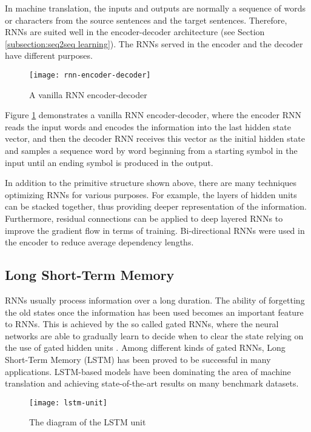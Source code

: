 In machine translation, the inputs and outputs are normally a sequence of words or characters from the source sentences and the target sentences. Therefore, RNNs are suited well in the encoder-decoder architecture (see Section \ref{subsection:seq2seq learning}). The RNNs served in the encoder and the decoder have different purposes. 
\begin{figure}[h]
\texttt{[image: rnn-encoder-decoder]}
\centering
\caption{A vanilla RNN encoder-decoder}
\label{figure:vanilla rnn encoder-decoder}
\end{figure}
Figure \ref{figure:vanilla rnn encoder-decoder} demonstrates a vanilla RNN encoder-decoder, where the encoder RNN reads the input words and encodes the information into the last hidden state vector, and then the decoder RNN receives this vector as the initial hidden state and samples a sequence word by word beginning from a starting symbol in the input until an ending symbol is produced in the output.

In addition to the primitive structure shown above, there are many techniques optimizing RNNs for various purposes. For example, the layers of hidden units can be stacked together, thus providing deeper representation of the information. Furthermore, residual connections \cite{Wu2016} can be applied to deep layered RNNs to improve the gradient flow in terms of training. Bi-directional RNNs \cite{schuster1997bidirectional} were used in the encoder to reduce average dependency lengths.

\subsection{Long Short-Term Memory} \label{subsection:lstm}
RNNs usually process information over a long duration. The ability of forgetting the old states once the information has been used becomes an important feature to RNNs. This is achieved by the so called gated RNNs, where the neural networks are able to gradually learn to decide when to clear the state relying on the use of gated hidden units \cite{Goodfellow-et-al-2016}. Among different kinds of gated RNNs, Long Short-Term Memory (LSTM) \cite{hochreiter1997long} has been proved to be successful in many applications. LSTM-based models \cite{Wu2016,Sutskever2014} have been dominating the area of machine translation and achieving state-of-the-art results on many benchmark datasets.

\begin{figure}[h]
\texttt{[image: lstm-unit]}
\centering
\caption{The diagram of the LSTM unit}
\label{figure:lstm unit}
\end{figure}

